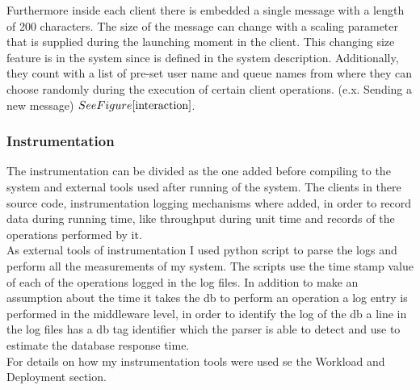 Furthermore inside each client there is embedded a single message with a length of 200 characters. The size of the message can change with a scaling parameter that is supplied during the launching moment in the client. This changing size feature is in the system since is defined in the system description. Additionally, they count with a list of pre-set user name and queue names from where they can choose randomly during the execution of certain client operations. (e.x. Sending a new message)  \( See Figure \ref{interaction} \).


\subsubsection{Instrumentation}\label{sec:instrumentation}

The instrumentation can be divided as the one added before compiling to the system and external tools used after running of the system. 
The clients in there source code, instrumentation logging mechanisms where added, in order to record data during running time, like throughput during unit time and records of the operations performed by it.\\

As external tools of instrumentation I used python script to parse the logs and perform all the measurements of my system. The scripts use the time stamp value of each of the operations logged in the log files. In addition to make an assumption about the time it takes the db to perform an operation a log entry is performed in the middleware level, in order to identify the log of the db a line in the log files has a db tag identifier which the parser is able to detect and use to estimate the database response time.\\

For details on how my instrumentation tools were used se the Workload and Deployment section. 


